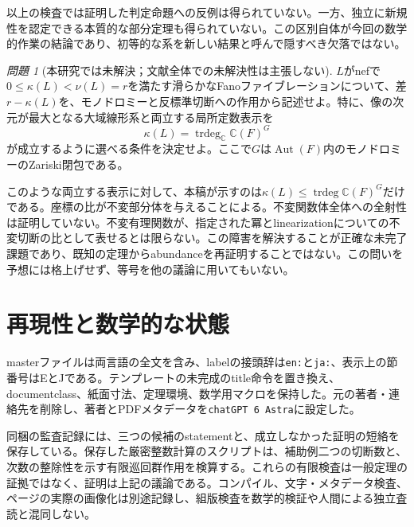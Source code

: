 \documentclass[12pt]{amsart}
\theoremstyle{definition}
\theoremstyle{remark}
\numberwithin{equation}{section}
\DeclareMathOperator{\Autop}{Aut}
\newcommand{\C}{\mathbb{C}}
\newtheorem{jques}[thm]{問題}
\begin{document}
以上の検査では証明した判定命題への反例は得られていない。一方、独立に新規性を認定できる本質的な部分定理も得られていない。この区別自体が今回の数学的作業の結論であり、初等的な系を新しい結果と呼んで隠すべき欠落ではない。

\begin{jques}[本研究では未解決；文献全体での未解決性は主張しない]\label{ja:question}
$L$がnefで$0\leq\kappa(L)<\nu(L)=r$を満たす滑らかなFanoファイブレーションについて、差$r-\kappa(L)$を、モノドロミーと反標準切断への作用から記述せよ。特に、像の次元が最大となる大域線形系と両立する局所定数表示を
\[
 \kappa(L)=\operatorname{trdeg}_{\C}\C(F)^G
\]
が成立するように選べる条件を決定せよ。ここで$G$は$\Autop(F)$内のモノドロミーのZariski閉包である。
\end{jques}
このような両立する表示に対して、本稿が示すのは$\kappa(L)\leq\operatorname{trdeg}\C(F)^G$だけである。座標の比が不変部分体を与えることによる。不変関数体全体への全射性は証明していない。不変有理関数が、指定された冪とlinearizationについての不変切断の比として表せるとは限らない。この障害を解決することが正確な未完了課題であり、既知の定理からabundanceを再証明することではない。この問いを予想には格上げせず、等号を他の議論に用いてもいない。

\section{再現性と数学的な状態}\label{ja:repro}
masterファイルは両言語の全文を含み、labelの接頭辞は\texttt{en:}と\texttt{ja:}、表示上の節番号はEとJである。テンプレートの未完成のtitle命令を置き換え、documentclass、紙面寸法、定理環境、数学用マクロを保持した。元の著者・連絡先を削除し、著者とPDFメタデータを\texttt{chatGPT 6 Astra}に設定した。

同梱の監査記録には、三つの候補のstatementと、成立しなかった証明の短絡を保存している。保存した厳密整数計算のスクリプトは、補助例二つの切断数と、次数の整除性を示す有限巡回群作用を検算する。これらの有限検査は一般定理の証拠ではなく、証明は上記の議論である。コンパイル、文字・メタデータ検査、ページの実際の画像化は別途記録し、組版検査を数学的検証や人間による独立査読と混同しない。
\end{document}

